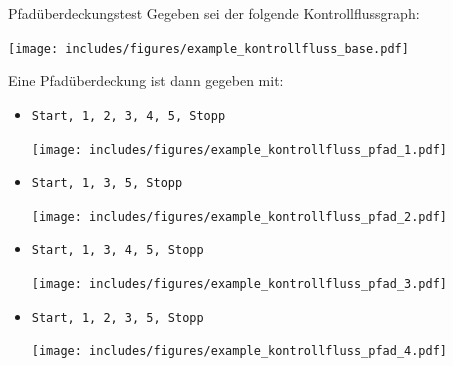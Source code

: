 \begin{example}{Pfadüberdeckungstest}
    Gegeben sei der folgende Kontrollflussgraph:
    \begin{center}
        \texttt{[image: includes/figures/example\_kontrollfluss\_base.pdf]}
    \end{center}

    Eine Pfadüberdeckung ist dann gegeben mit:
    \begin{itemize}
        \item \texttt{Start, 1, 2, 3, 4, 5, Stopp}

              \vspace{1em}
              \begin{center}
                  \texttt{[image: includes/figures/example\_kontrollfluss\_pfad\_1.pdf]}
              \end{center}
        \item \texttt{Start, 1, 3, 5, Stopp}

              \vspace{1em}
              \begin{center}
                  \texttt{[image: includes/figures/example\_kontrollfluss\_pfad\_2.pdf]}
              \end{center}
        \item \texttt{Start, 1, 3, 4, 5, Stopp}

              \vspace{1em}
              \begin{center}
                  \texttt{[image: includes/figures/example\_kontrollfluss\_pfad\_3.pdf]}
              \end{center}
        \item \texttt{Start, 1, 2, 3, 5, Stopp}

              \vspace{1em}
              \begin{center}
                  \texttt{[image: includes/figures/example\_kontrollfluss\_pfad\_4.pdf]}
              \end{center}
    \end{itemize}
\end{example}

